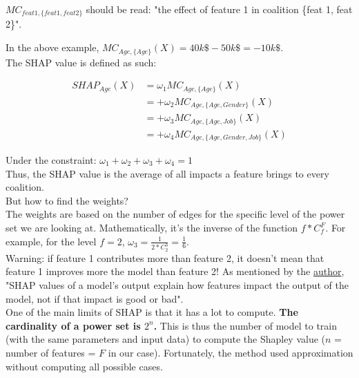$MC_{feat 1, \{feat 1, feat 2\}}$ should be read: "the effect of feature 1 in coalition \{feat 1, feat 2\}".

In the above example, $MC_{Age, \{Age\}} (X) = 40k\$ - 50k\$ = -10k\$$. \\

The SHAP value is defined as such:

\begin{align*}
  SHAP_{Age}(X) &= \omega_1 MC_{Age, \{Age\}}(X)  \\
            &= + \omega_2 MC_{Age, \{Age, Gender\}}(X)  \\
	   &= + \omega_3 MC_{Age, \{Age, Job\}}(X) \\
	   &= + \omega_4 MC_{Age, \{Age, Gender, Job\}}(X)
\end{align*}

Under the constraint: $\omega_1 + \omega_2 + \omega_3 + \omega_4 = 1$ \\

Thus, the SHAP value is the average of all impacts a feature brings to every coalition. \\

But how to find the weights? \\

The weights are based on the number of edges for the specific level of the power set we are looking at. Mathematically, it's the inverse of the function $f*C_f^F$. For example, for the level $f=2$, $\omega_3 = \frac{1}{2*C_2^3} = \frac{1}{6}$. \\

Warning: if feature 1 contributes more than feature 2, it doesn't mean that feature 1 improves more the model than feature 2! As mentioned by the \href{https://github.com/slundberg/shap/issues/367}{author}, "SHAP values of a model's output explain how features impact the output of the model, not if that impact is good or bad".\\

One of the main limits of SHAP is that it has a lot to compute. \textbf{The cardinality of a power set is $2^n$.} This is thus the number of model to train (with the same parameters and input data) to compute the Shapley value ($n$ = number of features = $F$ in our case). Fortunately, the method used approximation without computing all possible cases. \\

\vspace{5mm}